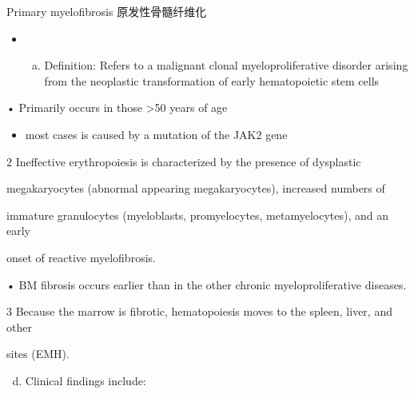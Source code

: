 \documentclass[
  ignorenonframetext,
]{beamer}
\providecommand{\tightlist}{%
  \setlength{\itemsep}{0pt}\setlength{\parskip}{0pt}}
\begin{document}
\begin{frame}
\begin{block}{Primary myelofibrosis 原发性骨髓纤维化}
\protect\hypertarget{primary-myelofibrosis-ux539fux53d1ux6027ux9aa8ux9ad3ux7ea4ux7ef4ux5316}{}
\begin{itemize}
\item
  \begin{enumerate}
  [a.]
  \tightlist
  \item
    Definition: Refers to a malignant clonal myeloproliferative disorder
    arising from the neoplastic transformation of early hematopoietic
    stem cells
  \end{enumerate}
\end{itemize}

• Primarily occurs in those \textgreater50 years of age

\begin{itemize}
\tightlist
\item
  most cases is caused by a mutation of the JAK2 gene
\end{itemize}

\(2\) Ineffective erythropoiesis is characterized by the presence of
dysplastic

megakaryocytes (abnormal appearing megakaryocytes), increased numbers of

immature granulocytes (myeloblasts, promyelocytes, metamyelocytes), and
an early

onset of reactive myelofibrosis.

• BM fibrosis occurs earlier than in the other chronic
myeloproliferative diseases.

\(3\) Because the marrow is fibrotic, hematopoiesis moves to the spleen,
liver, and other

sites (EMH).

\begin{enumerate}
[a.]
\setcounter{enumi}{3}
\tightlist
\item
  Clinical findings include:
\end{enumerate}
\end{block}
\end{frame}
\end{document}
